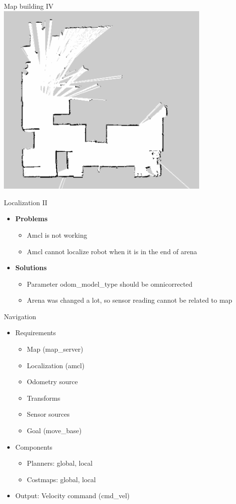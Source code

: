 \begin{frame}{Map building IV}
\centering
\includegraphics[width=0.8\textwidth]{gfx/map.png}
\end{frame}
\begin{frame}{Localization II}
\begin{itemize}
\item \textbf{Problems}
    \begin{itemize}
    \item Amcl is not working
    \item Amcl cannot localize robot when it is in the end of arena
    \end{itemize}
\item \textbf{Solutions}
	\begin{itemize}
	\item Parameter odom\_model\_type should be omni\-corrected
	\item Arena was changed a lot, so sensor reading cannot be related to map
	\end{itemize}
\end{itemize}
\end{frame}
\begin{frame}{Navigation}
\begin{itemize}
	\item Requirements
		\begin{itemize}
			\item Map (map\_server)
			\item Localization (amcl)
			\item Odometry source
			\item Transforms
			\item Sensor sources
			\item Goal (move\_base) 
		\end{itemize}
	\item Components
		\begin{itemize}
			\item Planners: global, local
			\item Costmaps: global, local
		\end{itemize}
	\item Output: Velocity command (cmd\_vel)
\end{itemize}
\end{frame}
